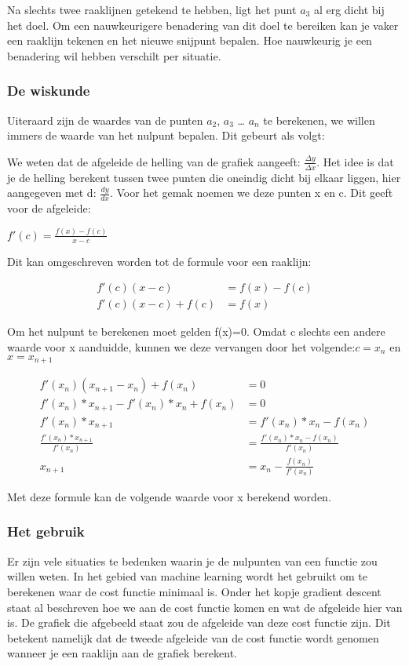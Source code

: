 Na slechts twee raaklijnen getekend te hebben, ligt het punt $ a_3 $ al erg dicht bij het doel. Om een nauwkeurigere benadering van dit doel te bereiken kan je vaker een raaklijn tekenen en het nieuwe snijpunt bepalen. Hoe nauwkeurig je een benadering wil hebben verschilt per situatie.

\subsubsection{De wiskunde}
Uiteraard zijn de waardes van de punten $ a_2 $, $ a_3 $ … $ a_n $ te berekenen, we willen immers de waarde van het nulpunt bepalen. Dit gebeurt als volgt:

We weten dat de afgeleide de helling van de grafiek aangeeft: $ \frac{\Delta y}{\Delta x} $. Het idee is dat je de helling berekent tussen twee punten die oneindig dicht bij elkaar liggen, hier aangegeven met d: $ \frac{dy}{dx} $. Voor het gemak noemen we deze punten x en c. Dit geeft voor de afgeleide:

\begin{center}
$ f'(c) = \frac{f(x) - f(c)}{x - c}$
\end{center}

Dit kan omgeschreven worden tot de formule voor een raaklijn:

\begin{align}
	   f'(c)(x - c) &= f(x) - f(c) \\
f'(c)(x - c) + f(c) &= f(x)
\end{align}

Om het nulpunt te berekenen moet gelden f(x)=0. Omdat c slechts een andere waarde voor x aanduidde, kunnen we deze vervangen door het volgende:$ c = x_n $ en $ x = x_{n+1} $

\begin{align}
			 f'(x_n)(x_{n+1} - x_n) + f(x_n) &= 0 \\
	f'(x_n)* x_{n+1} - f'(x_n) * x_n + f(x_n)&= 0 \\
							f'(x_n)* x_{n+1} &= f'(x_n) * x_n - f(x_n) \\
		   \frac{f'(x_n) * x_{n+1}}{f'(x_n)} &= \frac{f'(x_n) * x _n - f(x_n)}{f'(x_n)} \\
									  x_{n+1}&= x_n - \frac{f(x_n)}{f'(x_n)}
\end{align}




Met deze formule kan de volgende waarde voor x berekend worden.

\subsubsection{Het gebruik}
Er zijn vele situaties te bedenken waarin je de nulpunten van een functie zou willen weten. In het gebied van machine learning wordt het gebruikt om te berekenen waar de cost functie minimaal is. Onder het kopje gradient descent staat al beschreven hoe we aan de cost functie komen en wat de afgeleide hier van is. De grafiek die afgebeeld staat zou de afgeleide van deze cost functie zijn. Dit betekent namelijk dat de tweede afgeleide van de cost functie wordt genomen wanneer je een raaklijn aan de grafiek berekent.

